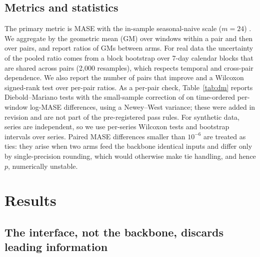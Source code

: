\documentclass[preprint,11pt,authoryear]{elsarticle}
\begin{document}
\subsection{Metrics and statistics}
The primary metric is MASE with the in-sample seasonal-naive scale ($m=24$) \citep{hyndman2006}. We aggregate by the geometric mean (GM) over windows within a pair and then over pairs, and report ratios of GMs between arms. For real data the uncertainty of the pooled ratio comes from a block bootstrap over 7-day calendar blocks that are shared across pairs (2,000 resamples), which respects temporal and cross-pair dependence. We also report the number of pairs that improve and a Wilcoxon signed-rank test over per-pair ratios. As a per-pair check, Table~\ref{tab:dm} reports Diebold--Mariano tests \citep{diebold1995} with the small-sample correction of \citet{harvey1997} on time-ordered per-window log-MASE differences, using a Newey--West variance; these were added in revision and are not part of the pre-registered pass rules. For synthetic data, series are independent, so we use per-series Wilcoxon tests and bootstrap intervals over series. Paired MASE differences smaller than $10^{-6}$ are treated as ties: they arise when two arms feed the backbone identical inputs and differ only by single-precision rounding, which would otherwise make tie handling, and hence $p$, numerically unstable.

\section{Results}
\label{sec:results}

\subsection{The interface, not the backbone, discards leading information}
\label{sec:gate}
\end{document}
